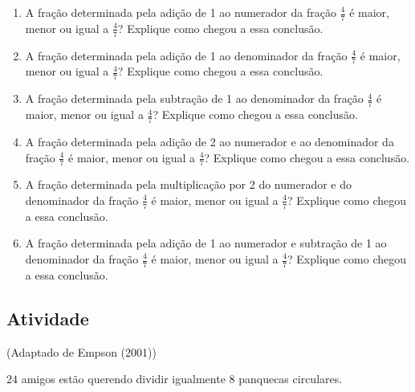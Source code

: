 \begin{enumerate} [\quad a)] %
  \item     A fração determinada pela adição de 1 ao numerador da fração     $\frac{4}{7}$ é maior, menor ou igual a     $\frac{4}{7}$? Explique como chegou a essa conclusão.
  \item     A fração determinada pela adição de 1 ao denominador da fração     $\frac{4}{7}$ é maior, menor ou igual a     $\frac{4}{7}$? Explique como chegou a essa conclusão.
  \item     A fração determinada pela subtração de 1 ao denominador da fração     $\frac{4}{7}$ é maior, menor ou igual a     $\frac{4}{7}$? Explique como chegou a essa conclusão.
  \item     A fração determinada pela adição de 2 ao numerador e ao denominador da fração     $\frac{4}{7}$ é maior, menor ou igual a     $\frac{4}{7}$? Explique como chegou a essa conclusão.
  \item     A fração determinada pela multiplicação por 2 do numerador e do denominador da fração     $\frac{4}{7}$ é maior, menor ou igual a     $\frac{4}{7}$? Explique como chegou a essa conclusão.
  \item     A fração determinada pela adição de 1 ao numerador e subtração de 1 ao denominador da fração     $\frac{4}{7}$ é maior, menor ou igual a     $\frac{4}{7}$? Explique como chegou a essa conclusão.
\end{enumerate} %

\subsection{Atividade}


(Adaptado de Empson (2001))

$24$ amigos estão querendo dividir igualmente $8$ panquecas circulares.

